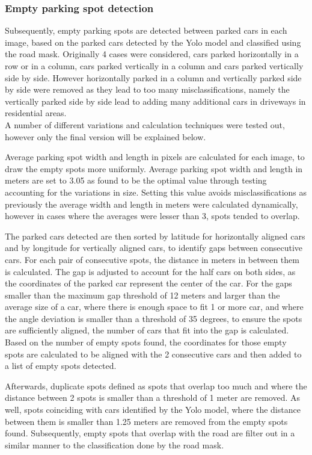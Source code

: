 \newpage

\subsubsection{Empty parking spot detection}
Subsequently, empty parking spots are detected between parked cars in each image, based on the parked cars detected by the Yolo model and classified using the road mask.
Originally 4 cases were considered, cars parked horizontally in a row or in a column, cars parked vertically in a column and cars parked vertically side by side. However horizontally parked in a column and vertically parked side by side were removed as they lead to too many misclassifications, namely the vertically parked side by side lead to adding many additional cars in driveways in residential areas.\\
A number of different variations and calculation techniques were tested out, however only the final version will be explained below.

Average parking spot width and length in pixels are calculated for each image, to draw the empty spots more uniformly. Average parking spot width and length in meters are set to 3.05 as found to be the optimal value through testing accounting for the variations in size.
Setting this value avoids misclassifications as previously the average width and length in meters were calculated dynamically, however in cases where the averages were lesser than 3, spots tended to overlap.

The parked cars detected are then sorted by latitude for horizontally aligned cars and by longitude for vertically aligned cars, to identify gaps between consecutive cars.
For each pair of consecutive spots, the distance in meters in between them is calculated. The gap is adjusted to account for the half cars on both sides, as the coordinates of the parked car represent the center of the car.
For the gaps smaller than the maximum gap threshold of 12 meters and larger than the average size of a car, where there is enough space to fit 1 or more car, and where the angle deviation is smaller than a threshold of 35 degrees, to ensure the spots are sufficiently aligned, the number of cars that fit into the gap is calculated.
Based on the number of empty spots found, the coordinates for those empty spots are calculated to be aligned with the 2 consecutive cars and then added to a list of empty spots detected.

Afterwards, duplicate spots defined as spots that overlap too much and where the distance between 2 spots is smaller than a threshold of 1 meter are removed.
As well, spots coinciding with cars identified by the Yolo model, where the distance between them is smaller than 1.25 meters are removed from the empty spots found.
Subsequently, empty spots that overlap with the road are filter out in a similar manner to the classification done by the road mask.

